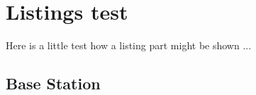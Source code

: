 \chapter{Listings test}

Here is a little test how a listing part might be shown ...

\lstset{style=listingstyle}



\section{Base Station}

%


\newpage


\newpage


\newpage


\newpage


\newpage
